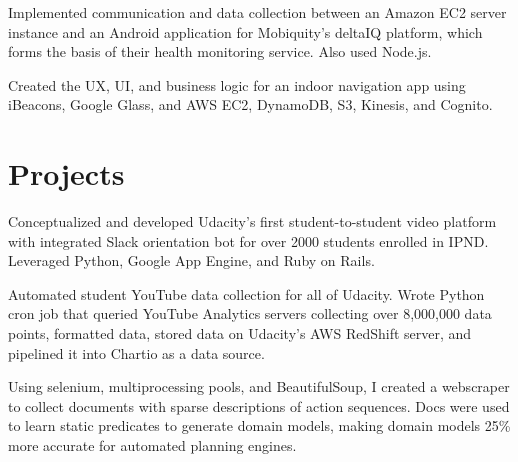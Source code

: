 \documentclass[]{deedy-resume-openfont}
\begin{document}
\begin{minipage}[t]{0.66\textwidth}
\begin{tightemize}
\item Implemented communication and data collection between an Amazon EC2 server instance and an Android application for Mobiquity’s deltaIQ platform, which forms the basis of their health monitoring service. Also used Node.js.

\item Created the UX, UI, and business logic for an indoor navigation app using iBeacons, Google Glass, and AWS EC2, DynamoDB, S3, Kinesis, and Cognito.
\end{tightemize}
\sectionsep


\section{Projects}

\begin{tightemize}
\item Conceptualized and developed Udacity's first student-to-student video platform with integrated Slack orientation bot for over 2000 students enrolled in IPND. Leveraged Python, Google App Engine, and Ruby on Rails.
\end{tightemize}
\sectionsep

\begin{tightemize}
\item Automated student YouTube data collection for all of Udacity. Wrote Python cron job that queried YouTube Analytics servers collecting over 8,000,000 data points, formatted data, stored data on Udacity's AWS RedShift server, and pipelined it into Chartio as a data source.
\end{tightemize}
\sectionsep

\begin{tightemize}
\item Using selenium, multiprocessing pools, and BeautifulSoup, I created a webscraper to collect documents with sparse descriptions of action sequences. Docs were used to learn static predicates to generate domain models, making domain models 25\% more accurate for automated planning engines.
\end{tightemize}
\sectionsep


\end{minipage}
\end{document}
